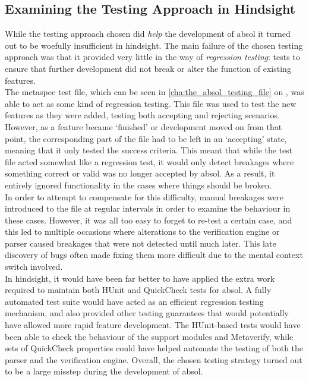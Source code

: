 \subsection{Examining the Testing Approach in Hindsight} %
\label{sub:examining_the_testing_approach_in_hindsight}
While the testing approach chosen did \textit{help} the development of \gls{absol} it turned out to be woefully insufficient in hindsight.
The main failure of the chosen testing approach was that it provided very little in the way of \textit{regression testing}: tests to ensure that further development did not break or alter the function of existing features. \\

The \gls{metaspec} test file, which can be seen in \autoref{cha:the_absol_testing_file} on , was able to act as some kind of regression testing.
This file was used to test the new features as they were added, testing both accepting and rejecting scenarios.
However, as a feature became `finished' or development moved on from that point, the corresponding part of the file had to be left in an `accepting' state, meaning that it only tested the success criteria.
This meant that while the test file acted somewhat like a regression test, it would only detect breakages where something correct or valid was no longer accepted by \gls{absol}.
As a result, it entirely ignored functionality in the cases where things should be broken.\\

In order to attempt to compensate for this difficulty, manual breakages were introduced to the file at regular intervals in order to examine the behaviour in these cases. 
However, it was all too easy to forget to re-test a certain case, and this led to multiple occasions where alterations to the verification engine or parser caused breakages that were not detected until much later.
This late discovery of bugs often made fixing them more difficult due to the mental context switch involved. \\

In hindsight, it would have been far better to have applied the extra work required to maintain both HUnit and QuickCheck tests for \gls{absol}.
A fully automated test suite would have acted as an efficient regression testing mechanism, and also provided other testing guarantees that would potentially have allowed more rapid feature development. 
The HUnit-based tests would have been able to check the behaviour of the support modules and Metaverify, while sets of QuickCheck properties could have helped automate the testing of both the parser and the verification engine.
Overall, the chosen testing strategy turned out to be a large misstep during the development of \gls{absol}.

